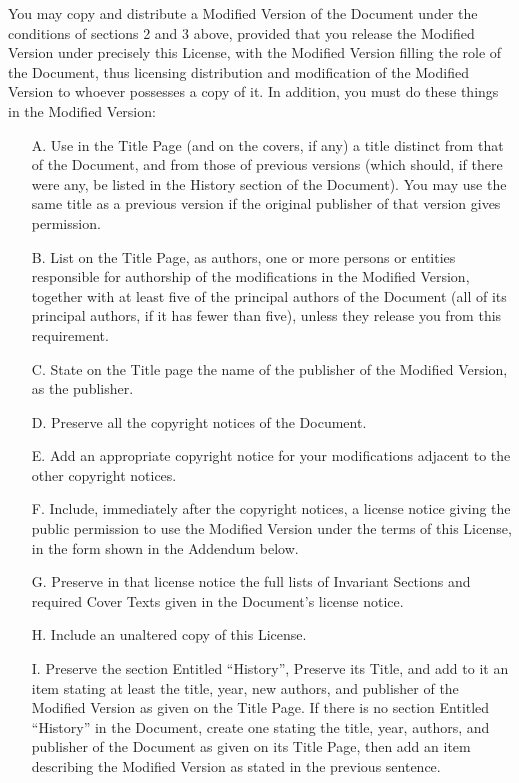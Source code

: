 \documentclass[10pt,a4paper,final]{book}
\begin{document}
{You may copy and distribute a Modified Version of the Document under
the conditions of sections 2 and 3 above, provided that you release
the Modified Version under precisely this License, with the Modified
Version filling the role of the Document, thus licensing distribution
and modification of the Modified Version to whoever possesses a copy
of it.  In addition, you must do these things in the Modified Version:

\begin{itemize}
\item[A.] 
   Use in the Title Page (and on the covers, if any) a title distinct
   from that of the Document, and from those of previous versions
   (which should, if there were any, be listed in the History section
   of the Document).  You may use the same title as a previous version
   if the original publisher of that version gives permission.
   
\item[B.]
   List on the Title Page, as authors, one or more persons or entities
   responsible for authorship of the modifications in the Modified
   Version, together with at least five of the principal authors of the
   Document (all of its principal authors, if it has fewer than five),
   unless they release you from this requirement.
   
\item[C.]
   State on the Title page the name of the publisher of the
   Modified Version, as the publisher.
   
\item[D.]
   Preserve all the copyright notices of the Document.
   
\item[E.]
   Add an appropriate copyright notice for your modifications
   adjacent to the other copyright notices.
   
\item[F.]
   Include, immediately after the copyright notices, a license notice
   giving the public permission to use the Modified Version under the
   terms of this License, in the form shown in the Addendum below.
   
\item[G.]
   Preserve in that license notice the full lists of Invariant Sections
   and required Cover Texts given in the Document's license notice.
   
\item[H.]
   Include an unaltered copy of this License.
   
\item[I.]
   Preserve the section Entitled ``History'', Preserve its Title, and add
   to it an item stating at least the title, year, new authors, and
   publisher of the Modified Version as given on the Title Page.  If
   there is no section Entitled ``History'' in the Document, create one
   stating the title, year, authors, and publisher of the Document as
   given on its Title Page, then add an item describing the Modified
   Version as stated in the previous sentence.
   

\end{itemize}}
\end{document}
